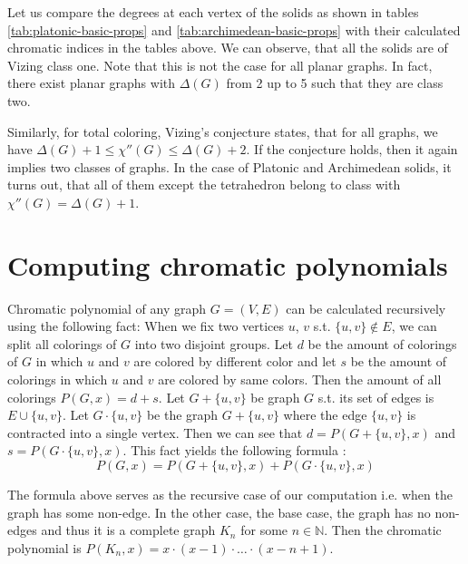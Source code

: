 Let us compare the degrees at each vertex of the solids as shown in tables \ref{tab:platonic-basic-props} and \ref{tab:archimedean-basic-props} with their calculated chromatic indices in the tables above. We can observe, that all the solids are of Vizing class one. Note that this is not the case for all planar graphs. In fact, there exist planar graphs with $\Delta(G)$ from 2 up to 5 such that they are class two.

Similarly, for total coloring, Vizing's conjecture \cite{vizing68} states, that for all graphs, we have $\Delta(G) + 1 \leq \chi''(G) \leq \Delta(G) + 2$. If the conjecture holds, then it again implies two classes of graphs. In the case of Platonic and Archimedean solids, it turns out, that all of them except the tetrahedron belong to class with $\chi''(G) = \Delta(G) + 1$.

\section{Computing chromatic polynomials}

\begin{highlight}

Chromatic polynomial of any graph $G=(V,E)$ can be calculated recursively using the following fact: When we fix two vertices $u$, $v$ s.t. $\{u,v\} \notin E$, we can split all colorings of $G$ into two disjoint groups. Let $d$ be the amount of colorings of $G$ in which $u$ and $v$ are colored by different color and let $s$ be the amount of colorings in which $u$ and $v$ are colored by same colors. Then the amount of all colorings $P(G,x) = d + s$. Let $G+\{u,v\}$ be graph $G$ s.t. its set of edges is $E \cup \{u,v\}$. Let $G \cdot \{u,v\}$ be the graph $G + \{u,v\}$ where the edge $\{u,v\}$ is contracted into a single vertex. Then we can see that $d = P(G + \{u,v\},x)$ and $s = P(G \cdot \{u,v\},x)$. This fact yields the following formula \cite{chartrand2019}:
\begin{equation}\label{eqn:chrom_poly_nonedge}
 P(G,x) = P(G + \{u,v\},x) + P(G \cdot \{u,v\},x) \tag{$P$}
\end{equation}

The formula above serves as the recursive case of our computation i.e. when the graph has some non-edge. In the other case, the base case, the graph has no non-edges and thus it is a complete graph $K_n$ for some $n \in \mathbb{N}$. Then the chromatic polynomial is $P(K_n,x) = x \cdot (x-1) \cdot \ldots \cdot (x-n+1)$.

\end{highlight}

